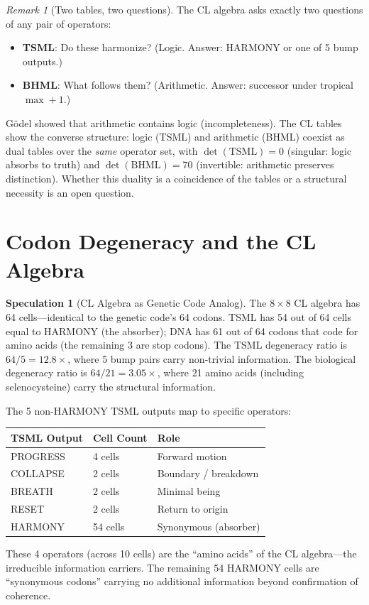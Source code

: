 \documentclass[11pt]{article}
\theoremstyle{definition}
\newtheorem{speculation}[theorem]{Speculation}
\theoremstyle{remark}
\newtheorem{remark}[theorem]{Remark}
\begin{document}
\begin{remark}[Two tables, two questions]
The CL algebra asks exactly two questions of any pair of operators:
\begin{itemize}[nosep]
  \item \textbf{TSML}: Do these harmonize?  (Logic.  Answer: HARMONY or one of
    5 bump outputs.)
  \item \textbf{BHML}: What follows them?  (Arithmetic.  Answer: successor
    under tropical $\max + 1$.)
\end{itemize}
G\"odel showed that arithmetic contains logic (incompleteness).  The CL tables
show the converse structure: logic (TSML) and arithmetic (BHML) coexist as dual
tables over the \emph{same} operator set, with $\det(\text{TSML}) = 0$
(singular: logic absorbs to truth) and $\det(\text{BHML}) = 70$ (invertible:
arithmetic preserves distinction).  Whether this duality is a coincidence of
the tables or a structural necessity is an open question.
\end{remark}

\section{Codon Degeneracy and the CL Algebra}
\label{sec:codon}

\begin{speculation}[CL Algebra as Genetic Code Analog]
\label{spec:codon}
The $8 \times 8$ CL algebra has 64 cells---identical to the genetic code's 64
codons.  TSML has 54 out of 64 cells equal to HARMONY (the absorber); DNA has
61 out of 64 codons that code for amino acids (the remaining 3 are stop codons).
The TSML degeneracy ratio is $64 / 5 = 12.8\times$, where 5 bump pairs carry
non-trivial information.  The biological degeneracy ratio is $64 / 21 = 3.05\times$,
where 21 amino acids (including selenocysteine) carry the structural information.

The 5 non-HARMONY TSML outputs map to specific operators:
\begin{center}
\begin{tabular}{lll}
\toprule
\textbf{TSML Output} & \textbf{Cell Count} & \textbf{Role} \\
\midrule
PROGRESS & 4 cells & Forward motion \\
COLLAPSE & 2 cells & Boundary / breakdown \\
BREATH & 2 cells & Minimal being \\
RESET & 2 cells & Return to origin \\
\midrule
HARMONY & 54 cells & Synonymous (absorber) \\
\bottomrule
\end{tabular}
\end{center}
These 4 operators (across 10 cells) are the ``amino acids'' of the CL
algebra---the irreducible information carriers.  The remaining 54 HARMONY cells
are ``synonymous codons'' carrying no additional information beyond confirmation
of coherence.
\end{speculation}
\end{document}
